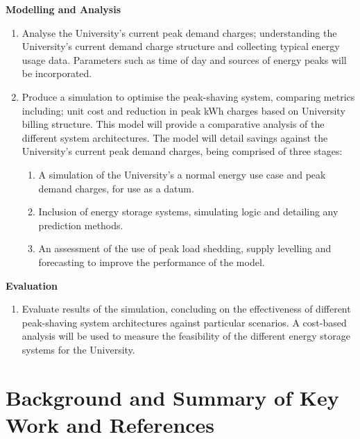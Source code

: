 \textbf{Modelling and Analysis}

\begin{enumerate}[resume]
\item Analyse the University’s current peak demand charges; understanding the University’s current demand charge structure and collecting typical energy usage data. Parameters such as time of day and sources of energy peaks will be incorporated.
\item Produce a simulation to optimise the peak-shaving system, comparing metrics including; unit cost and reduction in peak kWh charges based on University billing structure. This model will provide a comparative analysis of the different system architectures. The model will detail savings against the University’s current peak demand charges, being comprised of three stages:
\begin{enumerate}
\item A simulation of the University's a normal energy use case and peak demand charges, for use as a datum.
\item Inclusion of energy storage systems, simulating logic and detailing any prediction methods.
\item An assessment of the use of peak load shedding, supply levelling and forecasting to improve the performance of the model.
\end{enumerate}
\end{enumerate}

\textbf{Evaluation}

\begin{enumerate}[resume]
\item Evaluate results of the simulation, concluding on the effectiveness of different peak-shaving system architectures against particular scenarios. A cost-based analysis will be used to measure the feasibility of the different energy storage systems for the University.
\end{enumerate}

\newpage

\section{Background and Summary of Key Work and
References}\label{background-and-summary-of-key-work-and-references}

